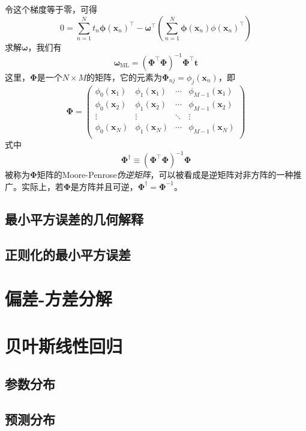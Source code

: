 \documentclass[11pt]{ctexbook}
\begin{document}
令这个梯度等于零，可得
\begin{equation}
	0 = \sum_{n=1}^{N}t_n\bm\phi(\bm x_n)^\top - \bm\omega^\top\left( \sum_{n=1}^{N}\bm\phi(\bm x_n)\phi(\bm x_n)^\top \right)
\end{equation}
求解$\bm\omega$，我们有
\begin{equation}
	\bm\omega_{\mathrm{ML}} = (\bm\Phi^\top\bm\Phi)^{-1}\bm\Phi^\top\bm t
\end{equation}
这里，$\bm\Phi$是一个$N\times M$的矩阵，它的元素为$\bm\Phi_{nj} = \phi_j(\bm x_n)$，即
\begin{equation}
	\bm\Phi = \left(
	\begin{matrix}
		\phi_0(\bm x_1) & \phi_1(\bm x_1) &\cdots & \phi_{M-1}(\bm x_1) \\
		\phi_0(\bm x_2) & \phi_1(\bm x_2) &\cdots & \phi_{M-1}(\bm x_2) \\
		\vdots & \vdots & \ddots & \vdots \\
		\phi_0(\bm x_N) & \phi_1(\bm x_N) &\cdots & \phi_{M-1}(\bm x_N) \\
	\end{matrix}
	\right)
\end{equation}
式中
\begin{equation}
	\bm\Phi^\dag \equiv (\bm\Phi^\top\bm\Phi)^{-1}\bm\Phi
\end{equation}
被称为$\bm\Phi$矩阵的Moore-Penrose\emph{伪逆矩阵}，可以被看成是逆矩阵对非方阵的一种推广。实际上，若$\bm\Phi$是方阵并且可逆，$\bm\Phi^\dag=\bm\Phi^{-1}$。
\subsection{最小平方误差的几何解释}
\subsection{正则化的最小平方误差}
\section{偏差-方差分解}
\section{贝叶斯线性回归}
\subsection{参数分布}
\subsection{预测分布}
\end{document}
